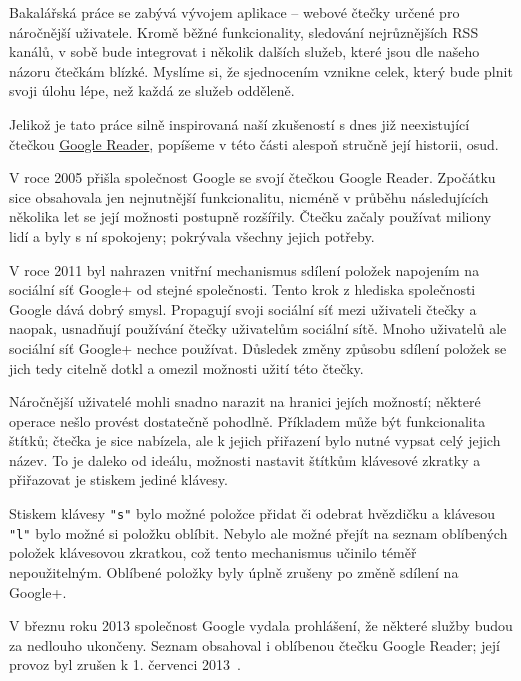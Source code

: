 
Bakalářská práce se zabývá vývojem aplikace -- webové čtečky určené pro náročnější uživatele.
Kromě běžné funkcionality, sledování nejrůznějších RSS kanálů, v sobě bude integrovat i několik dalších služeb, které jsou dle našeho názoru čtečkám blízké.
Myslíme si, že sjednocením vznikne celek, který bude plnit svoji úlohu lépe, než každá ze služeb odděleně.


Jelikož je tato práce silně inspirovaná naší zkušeností s dnes již neexistující čtečkou \href{http://www.google.com/reader/about/}{Google Reader}, popíšeme v této části alespoň stručně její historii, osud.


V roce 2005 přišla společnost Google se svojí čtečkou Google Reader.
Zpočátku sice obsahovala jen nejnutnější funkcionalitu, nicméně v průběhu následujících několika let se její možnosti postupně rozšířily.
Čtečku začaly používat miliony lidí a byly s ní spokojeny; pokrývala všechny jejich potřeby.

V roce 2011 byl nahrazen vnitřní mechanismus sdílení položek napojením na sociální síť Google+ od stejné společnosti.
Tento krok z hlediska společnosti Google dává dobrý smysl.
Propagují svoji sociální síť mezi uživateli čtečky a naopak, usnadňují používání čtečky uživatelům sociální sítě.
Mnoho uživatelů ale sociální síť Google+ nechce používat.
Důsledek změny způsobu sdílení položek se jich tedy citelně dotkl a omezil možnosti užití této čtečky.

Náročnější uživatelé mohli snadno narazit na hranici jejích možností; některé operace nešlo provést dostatečně pohodlně.
Příkladem může být funkcionalita štítků; čtečka je sice nabízela, ale k jejich přiřazení bylo nutné vypsat celý jejich název.
To je daleko od ideálu, možnosti nastavit štítkům klávesové zkratky a přiřazovat je stiskem jediné klávesy.

Stiskem klávesy \verb|"s"| bylo možné položce přidat či odebrat hvězdičku a klávesou \verb|"l"| bylo možné si položku oblíbit.
Nebylo ale možné přejít na seznam oblíbených položek klávesovou zkratkou, což tento mechanismus učinilo téměř nepoužitelným.
Oblíbené položky byly úplně zrušeny po změně sdílení na Google+.


V březnu roku 2013 společnost Google vydala prohlášení, že některé služby budou za nedlouho ukončeny.
Seznam obsahoval i oblíbenou čtečku Google Reader; její provoz byl zrušen k 1. červenci 2013~\cite{google-reader-down}.

